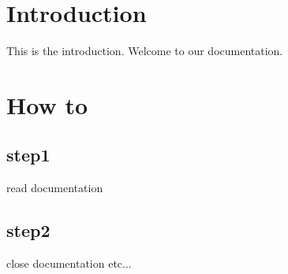 \hypertarget{index_intro_sec}{}\section{Introduction}\label{index_intro_sec}
This is the introduction. Welcome to our documentation.\hypertarget{index_how_to}{}\section{How to}\label{index_how_to}
\hypertarget{index_step1}{}\subsection{step1}\label{index_step1}
read documentation \hypertarget{index_step2}{}\subsection{step2}\label{index_step2}
close documentation etc...  